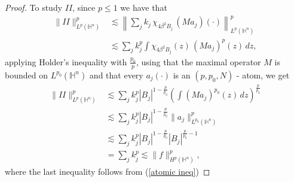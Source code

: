 \documentclass[reqno,10pt]{article}
\theoremstyle{definition}
\numberwithin{equation}{section}
\numberwithin{theorem}{section}
\begin{document}
\begin{proof}
To study $II$, since $p \leq 1$ we have that
\begin{equation*}
\begin{split}
\| II \|_{L^{p}(\mathbb{H}^n)}^p & \lesssim \left\| \sum_{j} k_j \, \chi_{4\beta^2B_{j}} \, (Ma_j)(\cdot) 
\right\|_{L^{p}(\mathbb{H}^n)}^p \\
& \lesssim \sum_{j} k_j^p \int \chi_{4\beta^2B_{j}}(z) \, (Ma_j)^p(z) \, dz, 
\end{split}
\end{equation*}
applying Holder's inequality with $\frac{p_0}{p}$, using that the maximal operator $M$ is bounded on $L^{p_0}(\mathbb{H}^n)$ and that every
$a_j(\cdot)$ is an $(p, p_0, N)$ - atom,  we get
\begin{equation*}
\begin{split}
\| II \|_{L^{p}(\mathbb{H}^n)}^p & \lesssim \sum_{j} k_j^p |B_j|^{1-\frac{p}{p_0}} 
\left( \int (Ma_j)^{p_0}(z) \, dz \right)^{\frac{p}{p_0}} \\
& \lesssim \sum_{j} k_j^p |B_j|^{1-\frac{p}{p_0}} \| a_j \|_{L^{p_0}(\mathbb{H}^n)}^p \\
& \lesssim \sum_{j} k_j^p |B_j|^{1-\frac{p}{p_0}} |B_j|^{\frac{p}{p_0} - 1} \\
& = \sum_{j} k_j^p \lesssim \|f \|_{H^{p}(\mathbb{H}^{n})}^{p},
\end{split}
\end{equation*}
where the last inequality follows from (\ref{atomic ineq})



\end{proof}
\end{document}
